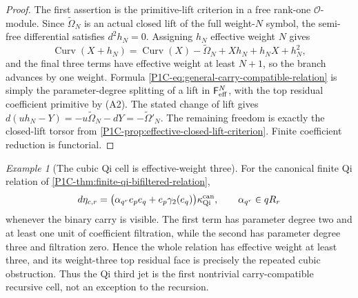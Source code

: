 \documentclass[11pt]{article}
\theoremstyle{remark}
\newtheorem{example}[theorem]{Example}
\begin{document}
\begin{proof}
The first assertion is the primitive-lift criterion in a free rank-one $\mathcal O$-module.  Since
$\widetilde\Omega_N$ is an actual closed lift of the full weight-$N$ symbol, the semi-free differential
satisfies $d^2h_N=0$.  Assigning $h_N$ effective weight $N$ gives
\[
 \operatorname{Curv}(X+h_N)
 =\operatorname{Curv}(X)-\widetilde\Omega_N+Xh_N+h_NX+h_N^2,
\]
and the final three terms have effective weight at least $N+1$, so the branch advances by one
weight.  Formula \eqref{P1C-eq:general-carry-compatible-relation} is simply the parameter-degree
splitting of a lift in $\mathsf F_{\rm eff}^{N}$, with the top residual coefficient primitive by (A2).
The stated change of lift gives
$d(u h_N-Y)=-u\widetilde\Omega_N-dY=-\widetilde\Omega'_N$.  The remaining freedom is exactly the
closed-lift torsor from \cref{P1C-prop:effective-closed-lift-criterion}.  Finite coefficient reduction is
functorial.
\end{proof}

\begin{example}[The cubic Qi cell is effective-weight three]
\label{P1C-ex:qi-effective-weight-three}
For the canonical finite Qi relation of \cref{P1C-thm:finite-qi-bifiltered-relation},
\[
 d\eta_{c,r}
 =\bigl(\alpha_{q^r}e_pe_q+e_p\gamma_2(e_q)\bigr)\kappa_{\rm Qi}^{\rm can},
 \qquad \alpha_{q^r}\in qR_r
\]
whenever the binary carry is visible.  The first term has parameter degree two and at least one unit
of coefficient filtration, while the second has parameter degree three and filtration zero.  Hence the
whole relation has effective weight at least three, and its weight-three top residual face is precisely
the repeated cubic obstruction.  Thus the Qi third jet is the first nontrivial carry-compatible
recursive cell, not an exception to the recursion.
\end{example}
\end{document}
